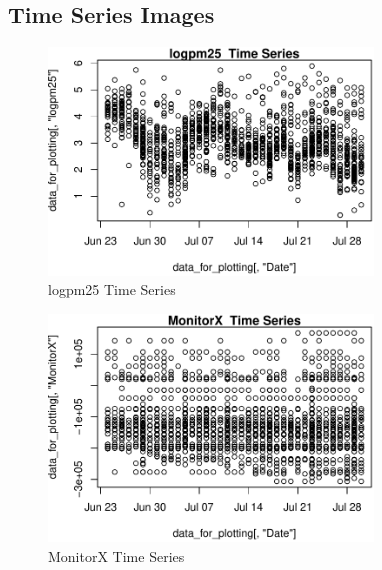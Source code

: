 
\subsection{ Time Series Images} 
 

\begin{figure} 
\centering  
\includegraphics[width=0.77\textwidth]{Code_Outputs/ML_input_report_AllforCaret_cleaned_StepPractice_part_practice_logpm25TS.pdf} 
\caption{\label{fig:ML_input_report_AllforCaret_cleaned_StepPractice_part_practicelogpm25TS}logpm25  Time Series} 
\end{figure} 
 

\begin{figure} 
\centering  
\includegraphics[width=0.77\textwidth]{Code_Outputs/ML_input_report_AllforCaret_cleaned_StepPractice_part_practice_MonitorXTS.pdf} 
\caption{\label{fig:ML_input_report_AllforCaret_cleaned_StepPractice_part_practiceMonitorXTS}MonitorX  Time Series} 
\end{figure} 
 

